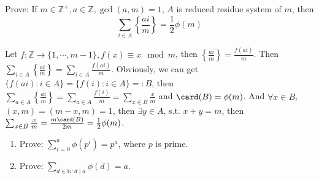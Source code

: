 \documentclass{ctexart}
\newif\ifpreface
\begin{document}
\large
\setlength{\baselineskip}{1.2em}
\ifpreface

\else
{}
\begin{problem}\label{pro:p42.2}
  Prove: If \(m \in \mathbb{Z}^{+},a \in \mathbb{Z}, \gcd(a,m)=1\), \(A\) is reduced residue system of \(m\), then
  \[
    \sum_{i \in A}\left\{\frac{ai}{m}\right\} = \frac{1}{2} \phi(m)
  \]
\end{problem}
\begin{solution}
  Let \(f: \mathbb{Z} \to \{1,\cdots,m-1\}, f(x) \equiv x \mod m \), then \(\left\{\frac{ai}{m}\right\}=\frac{f(ai)}{m}\).
  Then \(\sum_{i \in A}\left\{\frac{ai}{m}\right\}=\sum_{i \in A}\frac{f(ai)}{m}\).
  Obviously, we can get \(\{f(ai):i \in A\}=\{f(i):i \in A\}=:B\), then \(\sum_{a \in A}\left\{\frac{ai}{m}\right\}= \sum_{a \in A}\frac{f(i)}{m}= \sum_{x \in B}\frac{x}{m}\) and \(\card(B)=\phi(m)\).
  And \(\forall x \in B\), \((x,m)=(m-x, m)=1\), then \(\exists y \in A\), s.t. \(x + y =m\), then \(\sum_{x \in B}\frac{x}{m}=\frac{m \card(B)}{2m}=\frac{1}{2}\phi(m)\).
\end{solution}
\begin{problem}\label{pro:42.3}
  \begin{enumerate}
    \item Prove: \(\sum_{i=0}^{a}\phi(p^i)=p^a\), where \(p\) is prime.
    \item Prove: \(\sum_{d \in \mathbb{N}: d \mid a}\phi(d)=a\).
  \end{enumerate}
\end{problem}
\end{document}
